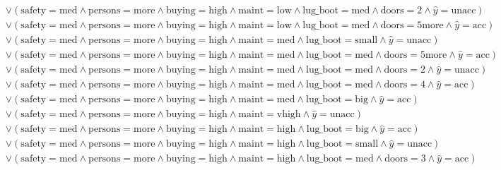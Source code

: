 \begin{scriptsize}
\[\begin{aligned}
  \\ & \lor (\text{safety}=\text{med} \land \text{persons}=\text{more} \land \text{buying}=\text{high} \land \text{maint}=\text{low} \land \text{lug_boot}=\text{med} \land \text{doors}=\text{2} \land \hat{y}=\text{unacc})
  \\ & \lor (\text{safety}=\text{med} \land \text{persons}=\text{more} \land \text{buying}=\text{high} \land \text{maint}=\text{low} \land \text{lug_boot}=\text{med} \land \text{doors}=\text{5more} \land \hat{y}=\text{acc})
  \\ & \lor (\text{safety}=\text{med} \land \text{persons}=\text{more} \land \text{buying}=\text{high} \land \text{maint}=\text{med} \land \text{lug_boot}=\text{small} \land \hat{y}=\text{unacc})
  \\ & \lor (\text{safety}=\text{med} \land \text{persons}=\text{more} \land \text{buying}=\text{high} \land \text{maint}=\text{med} \land \text{lug_boot}=\text{med} \land \text{doors}=\text{5more} \land \hat{y}=\text{acc})
  \\ & \lor (\text{safety}=\text{med} \land \text{persons}=\text{more} \land \text{buying}=\text{high} \land \text{maint}=\text{med} \land \text{lug_boot}=\text{med} \land \text{doors}=\text{2} \land \hat{y}=\text{unacc})
  \\ & \lor (\text{safety}=\text{med} \land \text{persons}=\text{more} \land \text{buying}=\text{high} \land \text{maint}=\text{med} \land \text{lug_boot}=\text{med} \land \text{doors}=\text{4} \land \hat{y}=\text{acc})
  \\ & \lor (\text{safety}=\text{med} \land \text{persons}=\text{more} \land \text{buying}=\text{high} \land \text{maint}=\text{med} \land \text{lug_boot}=\text{big} \land \hat{y}=\text{acc})
  \\ & \lor (\text{safety}=\text{med} \land \text{persons}=\text{more} \land \text{buying}=\text{high} \land \text{maint}=\text{vhigh} \land \hat{y}=\text{unacc})
  \\ & \lor (\text{safety}=\text{med} \land \text{persons}=\text{more} \land \text{buying}=\text{high} \land \text{maint}=\text{high} \land \text{lug_boot}=\text{big} \land \hat{y}=\text{acc})
  \\ & \lor (\text{safety}=\text{med} \land \text{persons}=\text{more} \land \text{buying}=\text{high} \land \text{maint}=\text{high} \land \text{lug_boot}=\text{small} \land \hat{y}=\text{unacc})
  \\ & \lor (\text{safety}=\text{med} \land \text{persons}=\text{more} \land \text{buying}=\text{high} \land \text{maint}=\text{high} \land \text{lug_boot}=\text{med} \land \text{doors}=\text{3} \land \hat{y}=\text{acc})

\end{aligned}\]
\end{scriptsize}
